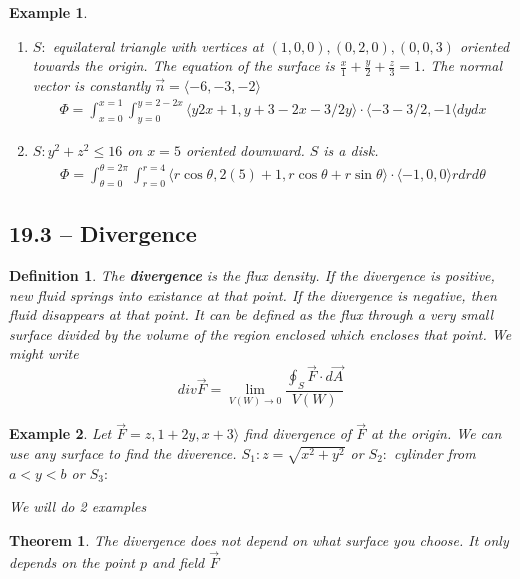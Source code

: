 \documentclass[11pt]{article}
\newtheorem{thm}{Theorem}
\newtheorem{defn}{Definition}
\newtheorem{ex}{Example}
\begin{document}
\begin{ex}
\begin{enumerate}
                \begin{align*}
                  \Phi  = \int_{x=-1}^{x=2} \int_{z=3}^{z=4} \langle 1,2x+1, 1+z \rangle \cdot \langle 0 , 1, 0 \rangle dz dx
                  \end{align*}
                \item $S : $ equilateral triangle with vertices at $(1,0,0), (0,2,0), (0,0,3)$ oriented towards the origin.
The equation of the surface is $\frac{x}{1} + \frac{y}{2} + \frac{z}{3} = 1$. The normal vector is constantly $\vec{n} = \langle -6, -3, -2 \rangle$
                \begin{align*}
                  \Phi  = \int_{x=0}^{x=1} \int_{y=0}^{y=2-2x}\langle y 2x+1, y + 3 - 2x - 3/2 y \rangle \cdot \langle -3 -3/2, -1 \langle dy dx
                  \end{align*}
                \item $S: y^{2} + z^{2} \le 16$ on $x=5$ oriented downward.
 $S$ is a disk.
                \begin{align*}
                  \Phi  = \int_{\theta = 0}^{\theta = 2\pi} \int_{r=0}^{r=4}\langle r\cos\theta, 2(5)+1, r\cos\theta + r\sin\theta \rangle \cdot \langle -1, 0, 0 \rangle r dr d\theta
                  \end{align*}
                \end{enumerate}
    \end{ex}
    \subsection{19.3 -- Divergence}

    \begin{defn}
      The \textbf{divergence} is the flux density. If the divergence is positive, new fluid springs into existance at that point. If the
      divergence is negative, then fluid disappears at that point. It can be defined as the flux through a very small surface divided by the volume of the region enclosed which encloses
      that point. We might write
      \[div \vec{F} = \lim_{V(W) \to 0} \frac{\oint_{S} \vec{F} \cdot d\vec{A}}{V(W)}\]
      \end{defn}
      \begin{ex}
        Let $\vec{F} = z, 1+2y, x+3 \rangle$ find divergence of $\vec{F}$ at the origin. We can use any surface to find the diverence.
        $S_{1} : z= \sqrt{x^{2}+y^{2}}$ or $S_{2} :$ cylinder from $ a  < y < b$ or $S_{3} : $

        We will do 2 examples
      \end{ex}
      \begin{thm}
        The divergence does not depend on what surface you choose. It only depends on the point $p$ and field $\vec{F}$
      \end{thm}
\end{document}
